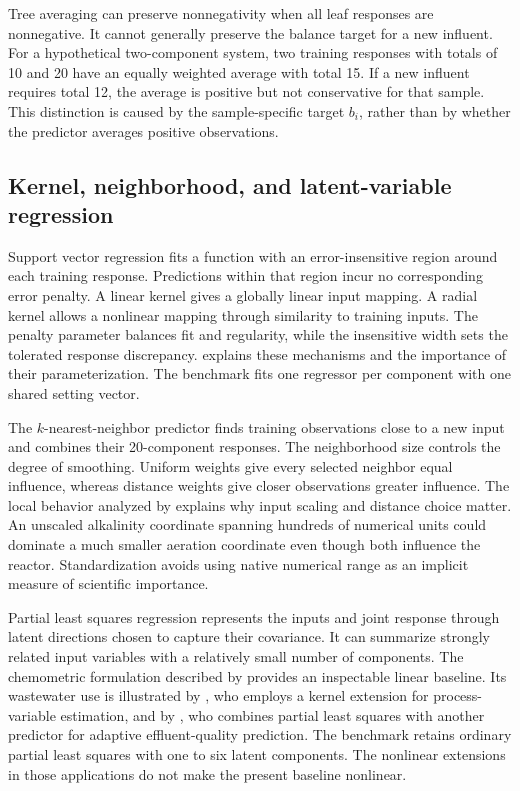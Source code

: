 Tree averaging can preserve nonnegativity when all leaf responses are nonnegative. It cannot generally preserve the balance target for a new influent. For a hypothetical two-component system, two training responses with totals of 10 and 20 have an equally weighted average with total 15. If a new influent requires total 12, the average is positive but not conservative for that sample. This distinction is caused by the sample-specific target $b_i$, rather than by whether the predictor averages positive observations.

\subsection{Kernel, neighborhood, and latent-variable regression}

Support vector regression fits a function with an error-insensitive region around each training response. Predictions within that region incur no corresponding error penalty. A linear kernel gives a globally linear input mapping. A radial kernel allows a nonlinear mapping through similarity to training inputs. The penalty parameter balances fit and regularity, while the insensitive width sets the tolerated response discrepancy. \citet{SmolaScholkopf2004} explains these mechanisms and the importance of their parameterization. The benchmark fits one regressor per component with one shared setting vector.

The $k$-nearest-neighbor predictor finds training observations close to a new input and combines their 20-component responses. The neighborhood size controls the degree of smoothing. Uniform weights give every selected neighbor equal influence, whereas distance weights give closer observations greater influence. The local behavior analyzed by \citet{Mack1981} explains why input scaling and distance choice matter. An unscaled alkalinity coordinate spanning hundreds of numerical units could dominate a much smaller aeration coordinate even though both influence the reactor. Standardization avoids using native numerical range as an implicit measure of scientific importance.

Partial least squares regression represents the inputs and joint response through latent directions chosen to capture their covariance. It can summarize strongly related input variables with a relatively small number of components. The chemometric formulation described by \citet{Wold2001} provides an inspectable linear baseline. Its wastewater use is illustrated by \citet{Woo2009}, who employs a kernel extension for process-variable estimation, and by \citet{Yang2021}, who combines partial least squares with another predictor for adaptive effluent-quality prediction. The benchmark retains ordinary partial least squares with one to six latent components. The nonlinear extensions in those applications do not make the present baseline nonlinear.

